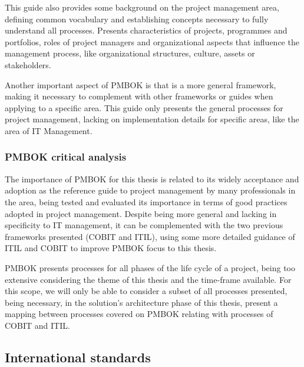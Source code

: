 This guide also provides some background on the project management area, defining common vocabulary and establishing concepts necessary to fully understand all processes. Presents characteristics of projects, programmes and portfolios, roles of project managers and organizational aspects that influence the management process, like organizational structures, culture, assets or stakeholders.\par 
Another important aspect of PMBOK is that is a more general framework, making it necessary to complement with other frameworks or guides when applying to a specific area. This guide only presents the general processes for project management, lacking on implementation details for specific areas, like the area of IT Management.\par 

\subsubsection{PMBOK critical analysis}

The importance of PMBOK for this thesis is related to its widely acceptance and adoption as the reference guide to project management by many professionals in the area, being tested and evaluated its importance in terms of good practices adopted in project management. Despite being more general and lacking in specificity to IT management, it can be complemented with the two previous frameworks presented (COBIT and ITIL), using some more detailed guidance of ITIL and COBIT to improve PMBOK focus to this thesis.\par
PMBOK presents processes for all phases of the life cycle of a project, being too extensive considering the theme of this thesis and the time-frame available. For this scope, we will only be able to consider a subset of all processes presented, being necessary, in the solution's architecture phase of this thesis, present a mapping between processes covered on PMBOK relating with processes of COBIT and ITIL.


\subsection{International standards}

